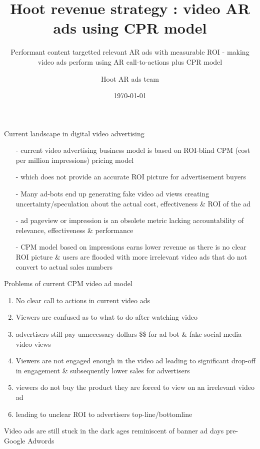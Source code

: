 \documentclass[11pt]{beamer}
\title{ Hoot revenue strategy : video AR ads using CPR model}
\subtitle{Performant content targetted relevant AR ads with measurable ROI - making video ads perform using AR call-to-actions plus CPR model}
\date{\today}
\author{Hoot AR ads team}
\institute{Hoot Live inc., a Delaware C-corp}
\begin{document}
\maketitle



\begin{frame}[fragile]{Current landscape in digital video advertising}
 \begin{itemize}[<+-| alert@+>]%
	 
\item[-]current video advertising business model is based on ROI-blind CPM (cost per million impressions) pricing model
\item[-]which does not provide an accurate ROI picture for advertisement buyers
\item[-]Many ad-bots end up generating fake video ad views creating uncertainty/speculation about the actual cost, effectiveness \& ROI of the ad
\item[-]ad pageview or impression is an obsolete metric lacking accountability of relevance, effectiveness \& performance 
\item[-]CPM model based on impressions earns lower revenue as there is no clear ROI picture \& users are flooded with more irrelevant video ads that do not convert to actual sales numbers
\end{itemize}

\end{frame}
\begin{frame}[t]{Problems of current CPM video ad model}
\begin{enumerate}[<+-| alert@+>]
\item No clear call to actions in current video ads
\item Viewers are confused as to what to do after watching video
\item advertisers still pay unnecessary dollars \$\$ for ad bot \& fake social-media video views
\item Viewers are not engaged enough in the video ad leading to significant drop-off in engagement \& subsequently lower sales for advertisers
\item viewers do not buy the product they are forced to view on an irrelevant video ad
\item leading to unclear ROI to advertisers top-line/bottomline

\end{enumerate}
\pause
\Large{Video ads are still stuck in the dark ages reminiscent of banner ad days pre-Google Adwords}
\end{frame}
\end{document}
